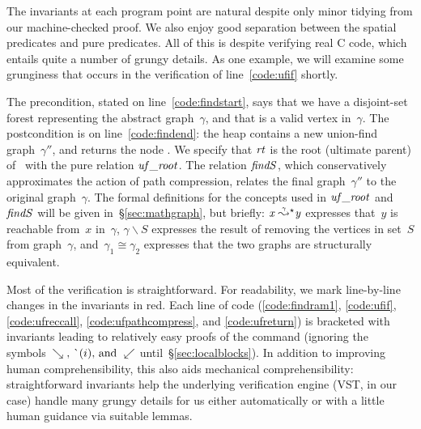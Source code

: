 The invariants at
each program point are natural despite only minor tidying from our machine-checked
proof.  We also enjoy good separation between the spatial predicates and pure
predicates.  All of this is despite verifying real C code, which entails quite a number
of grungy details. As one example, we will examine some grunginess that occurs in the
verification of line~\ref{code:ufif} shortly.

The precondition, stated on line~\ref{code:findstart}, says that we have a disjoint-set forest representing the abstract graph~$\gamma$, and that  is a valid vertex in~$\gamma$.  The postcondition is on line~\ref{code:findend}: the heap contains a new union-find graph~$\gamma''$, and  returns the node .
We specify that $\mathit{rt}$
is the root (ultimate parent) of~ with the pure relation $\mathit{uf\_root}$.
The relation $\mathit{findS}$, which conservatively approximates the action of path
compression, relates the final graph~$\gamma''$ to the original graph~$\gamma$.
The formal definitions for the concepts used in $\mathit{uf\_root}$ and $\mathit{findS}$
will be given in~\S\ref{sec:mathgraph}, but briefly:
${\mathit{x}\;\accentset{\gamma}{\leadsto}^{\star}_{} \mathit{y}}$ expresses that~$y$ is reachable
from~$x$ in~$\gamma$, $\gamma \smallsetminus S$ expresses the result of removing the
vertices in set~$S$ from graph~$\gamma$, and~$\gamma_1 \cong \gamma_2$ expresses that the two
graphs are structurally equivalent.

Most of the verification is straightforward. For readability, we mark 
line-by-line changes in the invariants in {\color{red}red}.
Each line of code
(\ref{code:findram1}, \ref{code:ufif}, \ref{code:ufreccall}, \ref{code:ufpathcompress},
and \ref{code:ufreturn}) is bracketed with invariants leading to relatively easy proofs
of the command (ignoring the symbols~$\searrow \text{, } \lightning(i) \text{, and }
\swarrow$ until~\S\ref{sec:localblocks}).
In addition to improving human comprehensibility, this
also aids mechanical comprehensibility: straightforward
invariants help the underlying verification engine (VST, in our case) handle many grungy
details for us either automatically or with a little human guidance via suitable lemmas.

